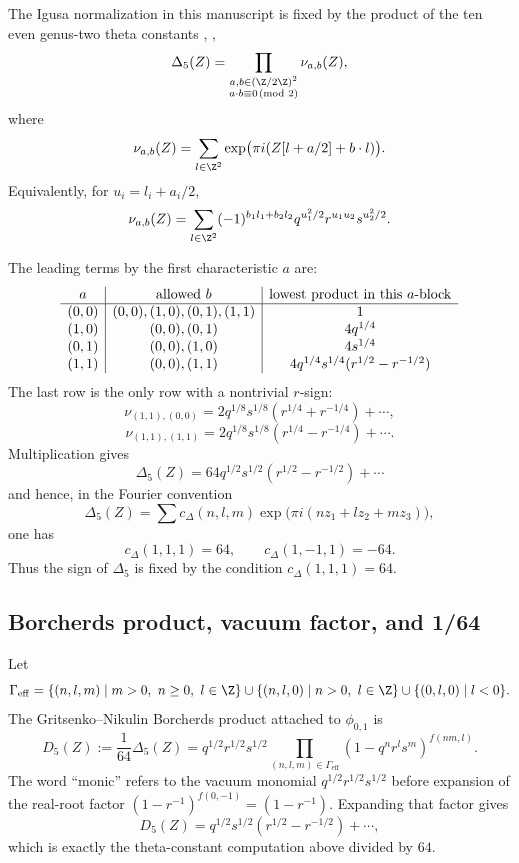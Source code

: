 The Igusa normalization in this manuscript is fixed by the product of the
ten even genus-two theta constants \cite{FREITAG:1}, \cite{VDGEER:1},
\cite{MAASS:1}
$$
\Delta_5(Z)=
\prod_{\substack{a,b\in(\Z/2\Z)^2\\ a\cdot b\equiv0\!\!\pmod2}}
\nu_{a,b}(Z),
$$
where
$$
\nu_{a,b}(Z)=
\sum_{l\in\Z^2}
\exp\bigl(\pi i(Z[l+a/2]+b\cdot l)\bigr).
$$
Equivalently, for $u_i=l_i+a_i/2$,
$$
\nu_{a,b}(Z)=
\sum_{l\in\Z^2}
(-1)^{b_1l_1+b_2l_2}
q^{u_1^2/2}r^{u_1u_2}s^{u_2^2/2}.
$$

The leading terms by the first characteristic $a$ are:
$$
\begin{array}{c|c|c}
a & \hbox{allowed } b & \hbox{lowest product in this } a\hbox{-block}\\
\hline
(0,0) & (0,0),(1,0),(0,1),(1,1) & 1\\
(1,0) & (0,0),(0,1) & 4q^{1/4}\\
(0,1) & (0,0),(1,0) & 4s^{1/4}\\
(1,1) & (0,0),(1,1) &
4q^{1/4}s^{1/4}(r^{1/2}-r^{-1/2})
\end{array}
$$
The last row is the only row with a nontrivial $r$-sign:
$$
\nu_{(1,1),(0,0)}
=2q^{1/8}s^{1/8}(r^{1/4}+r^{-1/4})+\cdots,
$$
$$
\nu_{(1,1),(1,1)}
=2q^{1/8}s^{1/8}(r^{1/4}-r^{-1/4})+\cdots.
$$
Multiplication gives
$$
\Delta_5(Z)
=64q^{1/2}s^{1/2}(r^{1/2}-r^{-1/2})+\cdots
$$
and hence, in the Fourier convention
$$
\Delta_5(Z)
=\sum c_\Delta(n,l,m)\exp\bigl(\pi i(nz_1+lz_2+mz_3)\bigr),
$$
one has
$$
c_\Delta(1,1,1)=64,\qquad c_\Delta(1,-1,1)=-64.
$$
Thus the sign of $\Delta_5$ is fixed by the condition
$c_\Delta(1,1,1)=64$.

\subsection{Borcherds product, vacuum factor, and 1/64}

Let
$$
\Gamma_{\mathrm{eff}}
=\{(n,l,m)\mid m>0,\ n\geq0,\ l\in\Z\}
\cup\{(n,l,0)\mid n>0,\ l\in\Z\}
\cup\{(0,l,0)\mid l<0\}.
$$
The Gritsenko--Nikulin Borcherds product attached to $\phi_{0,1}$ is
$$
D_5(Z):=\frac{1}{64}\Delta_5(Z)
=q^{1/2}r^{1/2}s^{1/2}
\prod_{(n,l,m)\in\Gamma_{\mathrm{eff}}}
(1-q^nr^ls^m)^{f(nm,l)}.
$$
The word ``monic'' refers to the vacuum monomial
$q^{1/2}r^{1/2}s^{1/2}$ before expansion of the real-root factor
$(1-r^{-1})^{f(0,-1)}=(1-r^{-1})$.  Expanding that factor gives
$$
D_5(Z)
=q^{1/2}s^{1/2}(r^{1/2}-r^{-1/2})+\cdots,
$$
which is exactly the theta-constant computation above divided by $64$.

